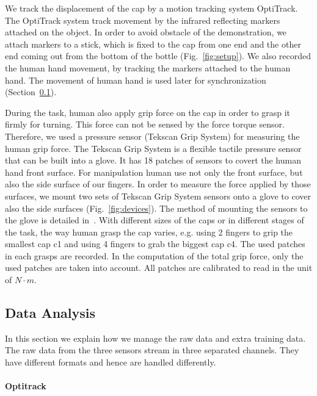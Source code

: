 We track the displacement of the cap by a motion tracking system OptiTrack. The OptiTrack system track movement by the infrared reflecting markers attached on the object. In order to avoid obstacle of the demonstration, we attach markers to a stick, which is fixed to the cap from one end and the other end coming out from the bottom of the bottle (Fig.~\ref{fig:setup}). We also recorded the human hand movement, by tracking the markers attached to the human hand. The movement of human hand is used later for synchronization (Section~\ref{cha4:sec3:dataanalysis}).

During the task, human also apply grip force on the cap in order to grasp it firmly for turning. This force can not be sensed by the force torque sensor. Therefore, we used a pressure sensor (Tekscan Grip System) for measuring the human grip force. The Tekscan Grip System is a flexible tactile pressure sensor that can be built into a glove. It has 18 patches of sensors to covert the human hand front surface. For manipulation human use not only the front surface, but also the side surface of our fingers. In order to measure the force applied by those surfaces, we mount two sets of Tekscan Grip System sensors onto a glove to cover also the side surfaces (Fig.~\ref{fig:devices}). The method of mounting the sensors to the glove is detailed in~\cite{deSouza2014}. With different sizes of the caps or in different stages of the task, the way human grasp the cap varies, e.g. using 2 fingers to grip the smallest cap c1 and using 4 fingers to grab the biggest cap c4. The used patches in each grasps are recorded. In the computation of the total grip force, only the used patches are taken into account. All patches are calibrated to read in the unit of $N{\cdot}m$.


\subsection{Data Analysis}
\label{cha4:sec3:dataanalysis}
In this section we explain how we manage the raw data and extra training data.
The raw data from the three sensors stream in three separated channels. They have different formats and hence are handled differently.


\paragraph{Optitrack}

